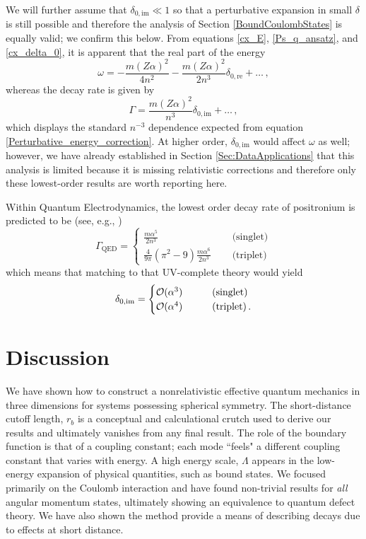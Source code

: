 \documentclass[pra,twocolumn,nofootinbib, superscriptaddress]{revtex4}%
\def\sec#1{\section{#1} }
\def\({\left(}
\def\){\right)}
\def\a{\alpha}
\def\f#1#2{\frac{#1}{#2}}
\def\de{\delta}
\def\o{\omega}
\begin{document}
We will further assume that $\de_{0,\text{im}}\ll1$ so that a perturbative expansion in small $\de$ is still possible and therefore the analysis of Section \ref{BoundCoulombStates} is equally valid; we confirm this below. From equations \eqref{cx_E}, \eqref{Ps_q_ansatz}, and \eqref{cx_delta_0}, it is apparent that the real part of the energy
\begin{equation}%
\o = -\f{m\(Z\a\)^2}{4n^2} -\f{m\(Z\a\)^2}{2n^3}\de_{0,\text{re}} +\dots\,,
\end{equation}
whereas the decay rate is given by
\begin{equation}\label{EQM_Decay_rate}
\Gamma = \f{m\(Z\a\)^2}{n^3}\de_{0,\text{im}} +\dots\,,
\end{equation}
which displays the standard $n^{-3}$ dependence expected from equation \eqref{Perturbative_energy_correction}. At higher order, $\de_{0,\text{im}}$ would affect $\o$ as well; however, we have already established in Section \ref{Sec:DataApplications} that this analysis is limited because it is missing relativistic corrections and therefore only these lowest-order results are worth reporting here.


Within Quantum Electrodynamics, the lowest order decay rate of positronium is predicted to be (see, e.g., \cite{Cassidy:2018}) 
\begin{equation}
\Gamma_\text{QED}=
\begin{cases}
\f{m\a^5}{2n^3}~~~~~~&\text{(singlet)}\\
\f{4}{9\pi}\(\pi^2-9\)\f{m\a^6}{2n^3}~~~~~~&\text{(triplet)}
\end{cases}
\end{equation}
which means that matching to that UV-complete theory would yield
\begin{equation}
\de_{0,\text{im}}=
\begin{cases}
{\cal O}(\a^3)~~~~~~&\text{(singlet)}\\
{\cal O}(\a^4)~~~~~~&\text{(triplet)}\,.
\end{cases}
\end{equation}










\sec{Discussion}\label{Sec:Discussion}

We have shown how to construct a nonrelativistic effective quantum mechanics in three dimensions for systems possessing spherical symmetry.  The short-distance cutoff length, $r_b$ is a conceptual and calculational crutch used to derive our results and ultimately vanishes from any final result. The role of the boundary function is that of a coupling constant; each mode ``feels" a different coupling constant that varies with energy. A high energy scale, $\Lambda$ appears in the low-energy expansion of physical quantities, such as bound states. We focused primarily on the Coulomb interaction and have found non-trivial results for \emph{all} angular momentum states, ultimately showing an equivalence to quantum defect theory. We have also shown the method provide a means of describing decays due to effects at short distance.
\end{document}
